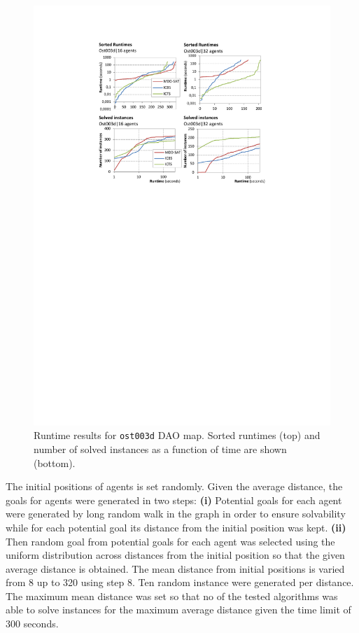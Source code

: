 \documentclass[jair,oneside,11pt]{article}
\begin{document}
\begin{figure}[h]
\centering
\includegraphics[trim={2.5cm 17.0cm 2.5cm 2.6cm},clip,width=1.0\textwidth]{expr_ost003_sorted.pdf}
\vspace{-0.6cm}\caption{Runtime results for \texttt{ost003d} DAO map. Sorted runtimes (top) and number of solved instances as a function of time are shown (bottom).}
\label{figure-ost003-sorted}
\end{figure}

The initial positions of agents is set randomly. Given the average distance, the goals for agents were generated in two steps: {\bf (i)} Potential goals for each agent were generated by long random walk in the graph in order to ensure solvability while for each potential goal its distance from the initial position was kept. {\bf (ii)} Then random goal from potential goals for each agent was selected using the uniform distribution across distances from the initial position so that the given average distance is obtained. The mean distance from initial positions is varied from 8 up to 320 using step 8. Ten random instance were generated per distance. The maximum mean distance was set so that no of the tested algorithms was able to solve instances for the maximum average distance given the time limit of 300 seconds.
\end{document}
